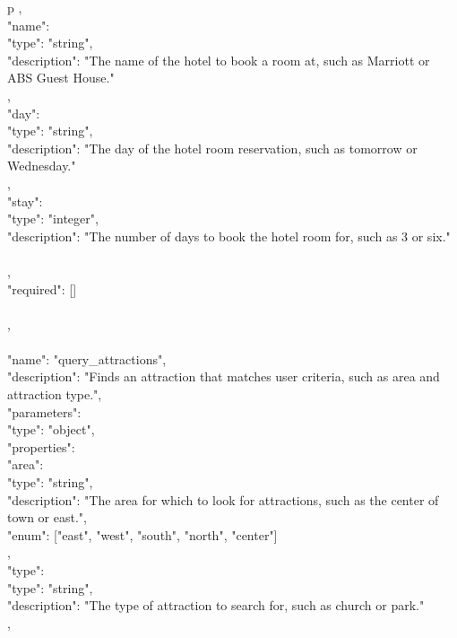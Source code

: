 \begin{table*}
\begin{tabular}{p\linewidth}
{{{{		        },\\
                "name": {\\
                    "type": "string",\\
                    "description": "The name of the hotel to book a room at, such as Marriott or ABS Guest House."\\
		        },\\
                "day": {\\
                    "type": "string",\\
                    "description": "The day of the hotel room reservation, such as tomorrow or Wednesday."\\
		        },\\
		        "stay": {\\
                    "type": "integer",\\
                    "description": "The number of days to book the hotel room for, such as 3 or six."\\
		        }\\
            },\\
            "required": []\\
	    }\\
    },\\
    {\\
        "name": "query\_attractions",\\
        "description": "Finds an attraction that matches user criteria, such as area and attraction type.",\\
        "parameters": {\\
            "type": "object",\\
            "properties": {\\
                "area": {\\
                    "type": "string",\\
                    "description": "The area for which to look for attractions, such as the center of town or east.",\\
                    "enum": ["east", "west", "south", "north", "center"]\\
                },\\
                "type": {\\
                    "type": "string",\\
                    "description": "The type of attraction to search for, such as church or park."\\
                },\\
}}}
\end{tabular}
\end{table*}
